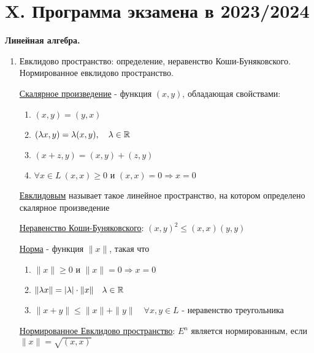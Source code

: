 \documentclass[12pt]{article}
\begin{document}
    \clearpage


    \section{X. Программа экзамена в 2023/2024}


    \begin{center}
        \textbf{Линейная алгебра.}
    \end{center}

    \begin{enumerate}
        \item Евклидово пространство: определение, неравенство Коши-Буняковского. Нормированное евклидово пространство.

        \hyperlink{scalarproductdefinition}{Скалярное произведение} - функция $(x, y)$, обладающая свойствами:

        \begin{enumerate}
            \item $(x, y) = (y, x)$
            \item $(\lambda x, y) = \lambda (x, y), \quad \lambda \in \mathbb{R}$
            \item $(x + z, y) = (x, y) + (z, y)$
            \item $\forall x \in L\ (x, x) \geq 0$ и $(x, x) = 0 \Longrightarrow x = 0$
        \end{enumerate}

        \hyperlink{euclidspacedefinition}{Евклидовым} называет такое линейное пространство, на котором определено скалярное произведение

        \hyperlink{inequalityofCauchyBunyakovsky}{Неравенство Коши-Буняковского}: $(x, y)^2 \leq (x, x)(y, y)$

        \hyperlink{normdefinition}{Норма} - функция $\|x\|$, такая что

        \begin{enumerate}
            \item $\|x\| \geq 0$ и $\|x\| = 0 \Longrightarrow x = 0$
            \item $\|\lambda x\| = |\lambda| \cdot \|x\| \quad \lambda \in \mathbb{R}$
            \item $\|x + y\| \leq \|x\| + \|y\| \quad \forall x, y \in L$ - неравенство треугольника
        \end{enumerate}

        \hyperlink{normalizedeuclidspace}{Нормированное Евклидово пространство}: $E^n$ является нормированным, если $\|x\| = \sqrt{(x, x)}$


\end{enumerate}
\end{document}
